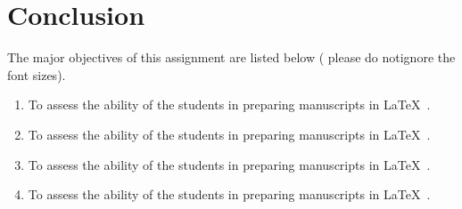 \documentclass[9pt,a4paper]{article}
\begin{document}
\section{Conclusion}
The major objectives of this assignment are listed below ( please do notignore the font
sizes).
\begin{enumerate}[\textbullet] %
    \item \begin{Large}{To assess the ability of the students in preparing manuscripts
in} \LaTeX\ .\end{Large}
\newpage
     \item \begin{large}{To assess the ability of the students in preparing manuscripts
in} \LaTeX\ .\end{large}
\item \begin{normalsize}{To assess the ability of the students in preparing manuscripts
in} \LaTeX\ .\end{normalsize} 
 \item \begin{footnotesize}{To assess the ability of the students in preparing manuscripts
in} \LaTeX\ .\end{footnotesize}



\end{enumerate}
\end{document}

